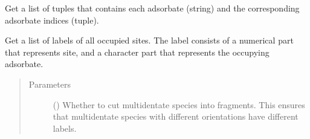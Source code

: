 \documentclass[letterpaper,10pt,english]{sphinxmanual}
\begin{document}
\begin{fulllineitems}
\begin{fulllineitems}
\begin{quote}
\begin{description}
\end{description}\end{quote}

\end{fulllineitems}


\begin{fulllineitems}
\label{\detokenize{modules:acat.adsorbate_coverage.SlabAdsorbateCoverage.get_adsorbates}}
Get a list of tuples that contains each adsorbate (string)
and the corresponding adsorbate indices (tuple).

\end{fulllineitems}


\begin{fulllineitems}
\label{\detokenize{modules:acat.adsorbate_coverage.SlabAdsorbateCoverage.get_occupied_labels}}
Get a list of labels of all occupied sites. The label consists
of a numerical part that represents site, and a character part
that represents the occupying adsorbate.
\begin{quote}\begin{description}
\item[{Parameters}] \leavevmode
{} (\sphinxstyleliteralemphasis{\sphinxupquote{, }}) \textendash{} Whether to cut multidentate species into fragments. This ensures
that multidentate species with different orientations have
different labels.

\end{description}\end{quote}

\end{fulllineitems}



\end{fulllineitems}
\end{document}
